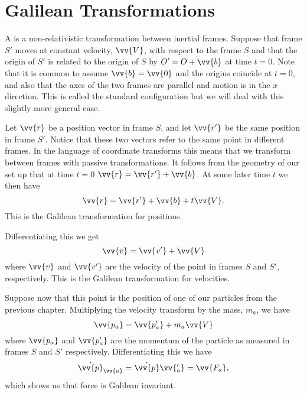 \documentclass[fleqn]{NotesClass}
\begin{document}
    \section{Galilean Transformations}
    A  is a non-relativistic transformation between inertial frames.
    Suppose that frame \(S'\) moves at constant velocity, \(\vv{V}\), with respect to the frame \(S\) and that the origin of \(S'\) is related to the origin of \(S\) by \(O' = O + \vv{b}\) at time \(t = 0\).
    Note that it is common to assume \(\vv{b} = \vv{0}\) and the origins coincide at \(t = 0\), and also that the axes of the two frames are parallel and motion is in the \(x\) direction.
    This is called the standard configuration but we will deal with this slightly more general case.
    
    Let \(\vv{r}\) be a position vector in frame \(S\), and let \(\vv{r'}\) be the same position in frame \(S'\).
    Notice that these two vectors refer to the same point in different frames.
    In the language of coordinate transforms this means that we transform between frames with passive transformations.
    It follows from the geometry of our set up that at time \(t = 0\) \(\vv{r} = \vv{r'} + \vv{b}\).
    At some later time \(t\) we then have 
    \begin{equation}
        \vv{r} = \vv{r'} + \vv{b} + t\vv{V}.
    \end{equation}
    This is the Galilean transformation for positions.
    
    Differentiating this we get
    \begin{equation}
        \vv{v} = \vv{v'} + \vv{V}
    \end{equation}
    where \(\vv{v}\) and \(\vv{v'}\) are the velocity of the point in frames \(S\) and \(S'\), respectively.
    This is the Galilean transformation for velocities.
    
    Suppose now that this point is the position of one of our particles from the previous chapter.
    Multiplying the velocity transform by the mass, \(m_a\), we have
    \begin{equation}
        \vv{p_a} = \vv{p_a'} + m_a\vv{V}
    \end{equation}
    where \(\vv{p_a}\) and \(\vv{p_a'}\) are the momentum of the particle as measured in frames \(S\) and \(S'\) respectively.
    Differentiating this we have
    \begin{equation}
        \dot{\vv{p}}_{\vv{a}} = \dot{\vv{p}}\vv{_a'} = \vv{F_a},
    \end{equation}
    which shows us that force is Galilean invariant.
    
\end{document}
